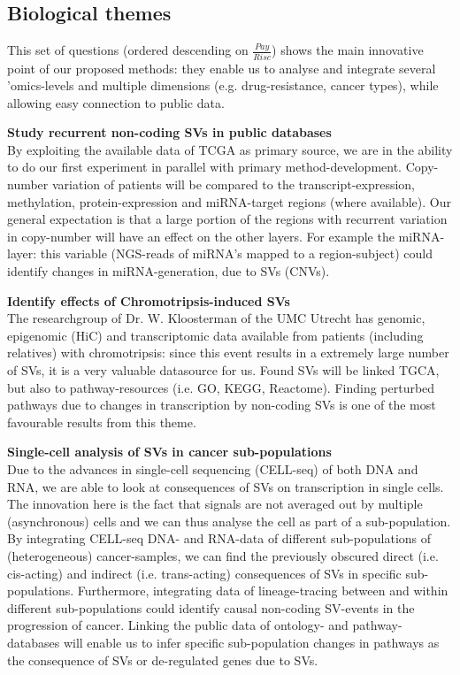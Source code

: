\documentclass[twoside,fontsize=12pt]{article}
\begin{document}
\subsection*{Biological themes}

This set of questions (ordered descending on $\frac{Pay}{Risc}$) shows the main innovative point of our proposed methods: they enable us to analyse and integrate several 'omics-levels and multiple dimensions (e.g. drug-resistance, cancer types), while allowing easy connection to public data. 
\medskip

\noindent
\textbf{Study recurrent non-coding SVs in public databases} \\
By exploiting the available data of TCGA as primary source, we are in the ability to do our first experiment in parallel with primary method-development. Copy-number variation of patients will be compared to the transcript-expression, methylation, protein-expression and miRNA-target regions (where available). Our general expectation is that a large portion of the regions with recurrent variation in copy-number will have an effect on the other layers. For example the miRNA-layer: this variable (NGS-reads of miRNA's mapped to a region-subject) could identify changes in miRNA-generation, due to SVs (CNVs).
\medskip

\noindent
\textbf{Identify effects of Chromotripsis-induced SVs} \\
The researchgroup of Dr. W. Kloosterman of the UMC Utrecht has genomic, epigenomic (HiC) and transcriptomic data available from patients (including relatives) with chromotripsis: since this event results in a extremely large number of SVs\cite{Kloosterman2014}, it is a very valuable datasource for us. Found SVs will be linked TGCA, but also to pathway-resources (i.e. GO, KEGG, Reactome). Finding perturbed pathways due to changes in transcription by non-coding SVs is one of the most favourable results from this theme.
\medskip

\noindent
\textbf{Single-cell analysis of SVs in cancer sub-populations} \\
Due to the advances in single-cell sequencing (CELL-seq) of both DNA and RNA, we are able to look at consequences of SVs on transcription in single cells. The innovation here is the fact that signals are not averaged out by multiple (asynchronous) cells and we can thus analyse the cell as part of a sub-population. By integrating CELL-seq DNA- and RNA-data of different sub-populations of (heterogeneous) cancer-samples, we can find the previously obscured direct (i.e. cis-acting) and indirect (i.e. trans-acting) consequences of SVs in specific sub-populations. Furthermore, integrating data of lineage-tracing between and within different sub-populations could identify causal non-coding SV-events in the progression of cancer. Linking the public data of ontology- and pathway-databases will enable us to infer specific sub-population changes in pathways as the consequence of SVs or de-regulated genes due to SVs.
\end{document}
